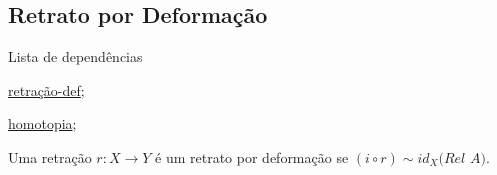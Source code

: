 \subsection{Retrato por Deformação}
\label{retrato-por-deformação-def}
\begin{titlemize}{Lista de dependências}
	\item \hyperref[retração-def]{retração-def};\\ %
	\item \hyperref[homotopia]{homotopia};\\
\end{titlemize}
\begin{defi}
	Uma retração $r:X \rightarrow Y$ é um retrato por deformação se $(i\circ r) \sim id_X \textit{(Rel A)}$.
\end{defi}
